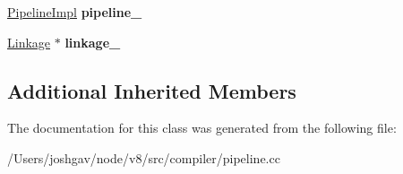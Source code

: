 \begin{DoxyCompactItemize}
\item 
\hyperlink{classv8_1_1internal_1_1compiler_1_1_pipeline_impl}{Pipeline\+Impl} {\bfseries pipeline\+\_\+}\hypertarget{classv8_1_1internal_1_1compiler_1_1_pipeline_compilation_job_aa7d226277ec44053fb01378af4b7a3b9}{}\label{classv8_1_1internal_1_1compiler_1_1_pipeline_compilation_job_aa7d226277ec44053fb01378af4b7a3b9}

\item 
\hyperlink{classv8_1_1internal_1_1compiler_1_1_linkage}{Linkage} $\ast$ {\bfseries linkage\+\_\+}\hypertarget{classv8_1_1internal_1_1compiler_1_1_pipeline_compilation_job_a855ae8194360d7da38a5cd3639cf05ae}{}\label{classv8_1_1internal_1_1compiler_1_1_pipeline_compilation_job_a855ae8194360d7da38a5cd3639cf05ae}

\end{DoxyCompactItemize}
\subsection*{Additional Inherited Members}


The documentation for this class was generated from the following file\+:\begin{DoxyCompactItemize}
\item 
/\+Users/joshgav/node/v8/src/compiler/pipeline.\+cc\end{DoxyCompactItemize}
